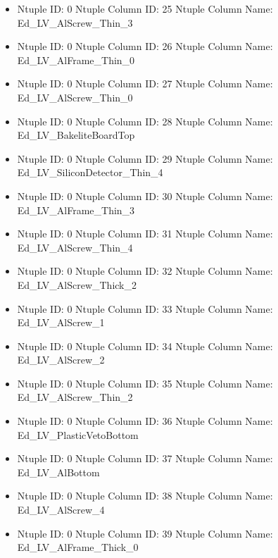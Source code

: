 \documentclass[8pt]{beamer}
\begin{document}
\begin{frame}
\begin{itemize}
        \item Ntuple ID: 0 Ntuple Column ID: 25 Ntuple Column Name: Ed\_LV\_AlScrew\_Thin\_3
        
        \item Ntuple ID: 0 Ntuple Column ID: 26 Ntuple Column Name: Ed\_LV\_AlFrame\_Thin\_0
        
        \item Ntuple ID: 0 Ntuple Column ID: 27 Ntuple Column Name: Ed\_LV\_AlScrew\_Thin\_0
        
        \item Ntuple ID: 0 Ntuple Column ID: 28 Ntuple Column Name: Ed\_LV\_BakeliteBoardTop
        
        \item Ntuple ID: 0 Ntuple Column ID: 29 Ntuple Column Name: Ed\_LV\_SiliconDetector\_Thin\_4
        
        \item Ntuple ID: 0 Ntuple Column ID: 30 Ntuple Column Name: Ed\_LV\_AlFrame\_Thin\_3
        
        \item Ntuple ID: 0 Ntuple Column ID: 31 Ntuple Column Name: Ed\_LV\_AlScrew\_Thin\_4
        
        \item Ntuple ID: 0 Ntuple Column ID: 32 Ntuple Column Name: Ed\_LV\_AlScrew\_Thick\_2
        
        \item Ntuple ID: 0 Ntuple Column ID: 33 Ntuple Column Name: Ed\_LV\_AlScrew\_1
        
        \item Ntuple ID: 0 Ntuple Column ID: 34 Ntuple Column Name: Ed\_LV\_AlScrew\_2
        
        \item Ntuple ID: 0 Ntuple Column ID: 35 Ntuple Column Name: Ed\_LV\_AlScrew\_Thin\_2
        
        \item Ntuple ID: 0 Ntuple Column ID: 36 Ntuple Column Name: Ed\_LV\_PlasticVetoBottom
        
        \item Ntuple ID: 0 Ntuple Column ID: 37 Ntuple Column Name: Ed\_LV\_AlBottom
        
        \item Ntuple ID: 0 Ntuple Column ID: 38 Ntuple Column Name: Ed\_LV\_AlScrew\_4
        
        \item Ntuple ID: 0 Ntuple Column ID: 39 Ntuple Column Name: Ed\_LV\_AlFrame\_Thick\_0
        

\end{itemize}
\end{frame}
\end{document}
